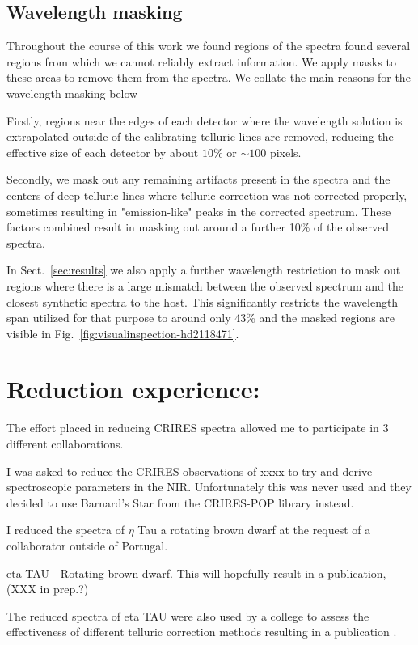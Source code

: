 \subsection{Wavelength masking}
Throughout the course of this work we found regions of the spectra found several regions from which we cannot reliably extract information.
We apply masks to these areas to remove them from the spectra. We collate the main reasons for the wavelength masking below 

Firstly, regions near the edges of each detector where the wavelength solution is extrapolated outside of the calibrating telluric lines are removed, reducing the effective size of each detector by about \(10\%\) or \(\sim100\) pixels. 

Secondly, we mask out any remaining artifacts present in the spectra and the centers of deep telluric lines where telluric correction was not corrected properly, sometimes resulting in "emission-like" peaks in the corrected spectrum. These factors combined result in masking out around a further 10\% of the observed spectra. 

In Sect.~\ref{sec:results} we also apply a further wavelength restriction to mask out regions where there is a large mismatch between the observed spectrum and the closest synthetic spectra to the host. This significantly restricts the wavelength span utilized for that purpose to around only 43\% and the masked regions are visible in Fig.~\ref{fig:visualinspection-hd2118471}. 





\section{Reduction experience:}
The effort placed in reducing CRIRES spectra allowed me to participate in 3 different collaborations.

I was asked to reduce the CRIRES observations of xxxx to try and derive spectroscopic parameters in the NIR. Unfortunately this was never used and they decided to use Barnard's Star from the CRIRES-POP library instead.

I reduced the spectra of $\eta$ Tau a rotating brown dwarf at the request of a collaborator outside of Portugal.
  
eta TAU - Rotating brown dwarf. This will hopefully result in a publication, (XXX in prep.?)

The reduced spectra of eta TAU were also used by a college to assess the effectiveness of different telluric correction methods resulting in a publication \citet{Ulmer-moll_2018}.
